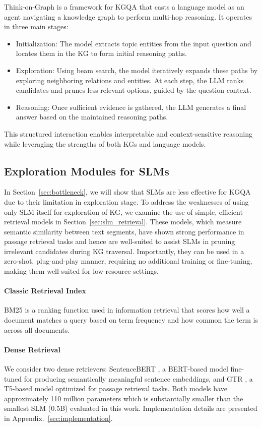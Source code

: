 \documentclass[11pt]{article}
\begin{document}
Think-on-Graph \cite{sun2024thinkongraph} is a framework for KGQA that casts a language model as an agent navigating a knowledge graph to perform multi-hop reasoning. It operates in three main stages:
\begin{itemize}
    \item Initialization: The model extracts topic entities from the input question and locates them in the KG to form initial reasoning paths.
    \item Exploration: Using beam search, the model iteratively expands these paths by exploring neighboring relations and entities. At each step, the LLM ranks candidates and prunes less relevant options, guided by the question context.
    \item Reasoning: Once sufficient evidence is gathered, the LLM generates a final answer based on the maintained reasoning paths.
\end{itemize}

This structured interaction enables interpretable and context-sensitive reasoning while leveraging the strengths of both KGs and language models.

\subsection{Exploration Modules for SLMs}
In Section~\ref{sec:bottleneck}, we will show that SLMs are less effective for KGQA due to their limitation in exploration stage. To address the weaknesses of using only SLM itself for exploration of KG, we examine the use of simple, efficient retrieval models in Section~\ref{sec:slm_retrieval}. These models, which measure semantic similarity between text segments, have shown strong performance in passage retrieval tasks and hence are well-suited to assist SLMs in pruning irrelevant candidates during KG traversal. Importantly, they can be used in a zero-shot, plug-and-play manner, requiring no additional training or fine-tuning, making them well-suited for low-resource settings.
\paragraph{Classic Retrieval Index} BM25 \cite{robertson2009bm25} is a ranking function used in information retrieval that scores how well a document matches a query based on term frequency and how common the term is across all documents. \paragraph{Dense Retrieval} We consider two dense retrievers: SentenceBERT \cite{reimers-gurevych-2019-sentence}, a BERT-based model fine-tuned for producing semantically meaningful sentence embeddings, and GTR \cite{ni-etal-2022-large}, a T5-based model optimized for passage retrieval tasks. Both models have approximately 110 million parameters which is substantially smaller than the smallest SLM (0.5B) evaluated in this work. Implementation details are presented in Appendix.~\ref{sec:implementation}.
\end{document}
